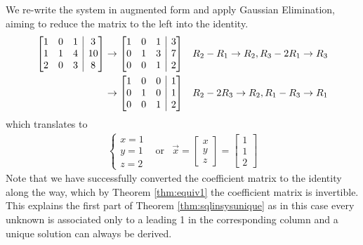 \begin{solution}
We re-write the system in augmented form and apply Gaussian Elimination, aiming to reduce the matrix to the left into the identity.
\begin{align*}
\left[\begin{array}{@{}ccc|c@{}}
1 & 0 & 1 & 3 \\
1 & 1 & 4 & 10 \\
2 & 0 & 3 & 8
\end{array}\right] 
& \to 
\left[\begin{array}{@{}ccc|c@{}}
1 & 0 & 1 & 3 \\
0 & 1 & 3 & 7 \\
0 & 0 & 1 & 2
\end{array}\right] 
& R_2-R_1 \to R_2, R_3-2R_1 \to R_3 \\
& \to 
\left[\begin{array}{@{}ccc|c@{}}
1 & 0 & 0 & 1 \\
0 & 1 & 0 & 1 \\
0 & 0 & 1 & 2
\end{array}\right] 
& R_2-2R_3 \to R_2, R_1-R_3 \to R_1
\end{align*}
which translates to
\begin{align*}
\begin{cases}
x = 1 \\
y = 1 \\
z = 2
\end{cases}
& \text{or} 
& \vec{x} = 
\begin{bmatrix}
x \\
y \\
z
\end{bmatrix}
=
\begin{bmatrix}
1 \\
1 \\
2
\end{bmatrix}
\end{align*}
Note that we have successfully converted the coefficient matrix to the identity along the way, which by Theorem \ref{thm:equiv1} the coefficient matrix is invertible. This explains the first part of Theorem \ref{thm:sqlinsysunique} as in this case every unknown is associated only to a leading 1 in the corresponding column  and a unique solution can always be derived.
\end{solution}

